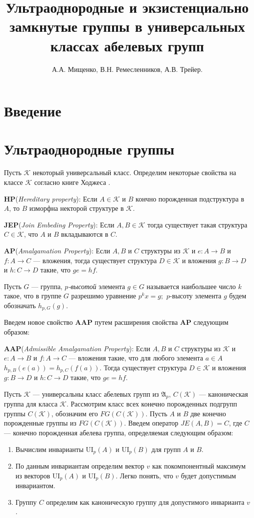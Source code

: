\documentclass[14pt]{extarticle} %
\title{Ультраоднородные и экзистенциально замкнутые группы в универсальных классах абелевых групп}
\author{А.А. Мищенко, В.Н. Ремесленников, А.В. Трейер.}
\def\A{{\mathfrak{A}}}
\def\K{{\mathcal{K}}}
\def\ui{{\mathrm{UI}}}
\def\HP{\textbf{HP}}
\def\JEP{\textbf{JEP}}
\def\AP{\textbf{AP}}
\def\AAP{\textbf{AAP}}
\begin{document}
\maketitle
\tableofcontents
\listoftodos



\section{Введение}

\section{Ультраоднородные группы}

Пусть $\K$ некоторый универсальный класс. Определим некоторые свойства на классе $\K$ согласно книге Ходжеса \cite{Hodges}.

\noindent \HP  (\textit{Hereditary property}): Если $A \in \K$ и $B$ кончно порожденная подструктура в $A$, то $B$ изморфна некторой структуре в $\K$. 

\noindent \JEP  (\textit{Join Embeding Property}): Если $A, B \in \K$ тогда существует такая структура $C \in \K$, что $A$ и $B$ вкладываются в $C$.

\noindent \AP  (\textit{Amalgamation Property}): Если $A, B$ и $C$ структуры из $\K$ и $e : A \rightarrow B$ и $f : A \rightarrow C$ --- вложения, тогда существует структура $D \in \K$ и вложения $g : B \rightarrow D$ и $h : C \rightarrow D$ такие, что $ge = hf$. 

Пусть $G$ --- группа, \textit{$p$-высотой} элемента $g \in G$ называется наибольшее число $k$ такое, что в группе $G$ разрешимо уравнение $p^k x = g;$ $p$-высоту элемента $g$ будем обозначать $h_{p,G}(g).$ 

Введем новое свойство \AAP{} путем расширения свойства \AP{} следующим образом:

\noindent \AAP (\textit{Admissible Amalgamation Property}): Если $A, B$ и $C$ структуры из $\K$ и $e : A \rightarrow B$ и $f : A \rightarrow C$ --- вложения такие, что для любого элемента $a \in A$ $h_{p,B}(e(a)) = h_{p,C}(f(a))$. Тогда существует структура $D \in \K$ и вложения $g : B \rightarrow D$ и $h : C \rightarrow D$ такие, что $ge = hf$. 

Пусть $\K$ --- универсальны класс абелевых групп из $\A_p$, $C(\K)$ --- каноническая группа для класса $\K$. Рассмотрим класс всех конечно порожденных подгрупп группы $C(\K)$, обозначим его $FG(C(\K))$. Пусть $A$ и $B$ две конечно порожденные группы из $FG(C(\K))$. Введем оператор $JE(A, B) = C$, где $C$ --- конечно порожденная абелева группа, определяемая следующим образом:
\begin{enumerate}
\item Вычислим инварианты $\ui_p(A)$ и $\ui_p(B)$ для групп $A$ и $B$.
\item По данным инвариантам определим вектор $v$ как покомпонентный максимум из векторов $\ui_p(A)$ и $\ui_p(B)$. Легко понять, что $v$ будет допустимым инвариантом.
\item Группу $C$ определим как каноническую группу для допустимого инварианта $v$.
\end{enumerate}
\end{document}
